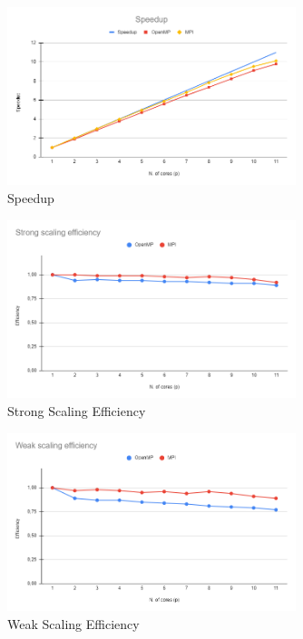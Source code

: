 \documentclass[a4paper,12pt, oneside]{article}
\begin{document}
\begin{figure}[h]
    \centering
    \includegraphics[width=0.75\textwidth]{speedup.png}
    \caption{Speedup}
    \label{fig:speedup}
\end{figure}

\begin{figure}[h]
    \centering
    \includegraphics[width=0.75\textwidth]{strong-scaling.png}
    \caption{Strong Scaling Efficiency}
    \label{fig:strong-scaling}
\end{figure}

\begin{figure}[h]
    \centering
    \includegraphics[width=0.75\textwidth]{weak-scaling.png}
    \caption{Weak Scaling Efficiency}
    \label{fig:weak-scaling}
\end{figure}
\end{document}
